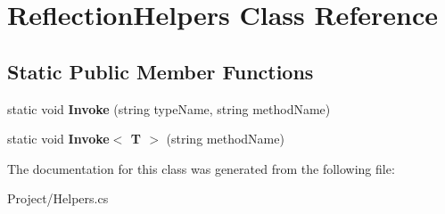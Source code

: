 \hypertarget{class_reflection_helpers}{}\section{Reflection\+Helpers Class Reference}
\label{class_reflection_helpers}
\subsection*{Static Public Member Functions}
\begin{DoxyCompactItemize}
\item 
\mbox{\label{class_reflection_helpers_a5882e880330b999887bc73ec4c012cdc}} 
static void {\bfseries Invoke} (string type\+Name, string method\+Name)
\item 
\mbox{\label{class_reflection_helpers_a061fa976e2978c0446f68c012e9aef62}} 
static void {\bfseries Invoke$<$ T $>$} (string method\+Name)
\end{DoxyCompactItemize}


The documentation for this class was generated from the following file\+:\begin{DoxyCompactItemize}
\item 
Project/Helpers.\+cs\end{DoxyCompactItemize}
